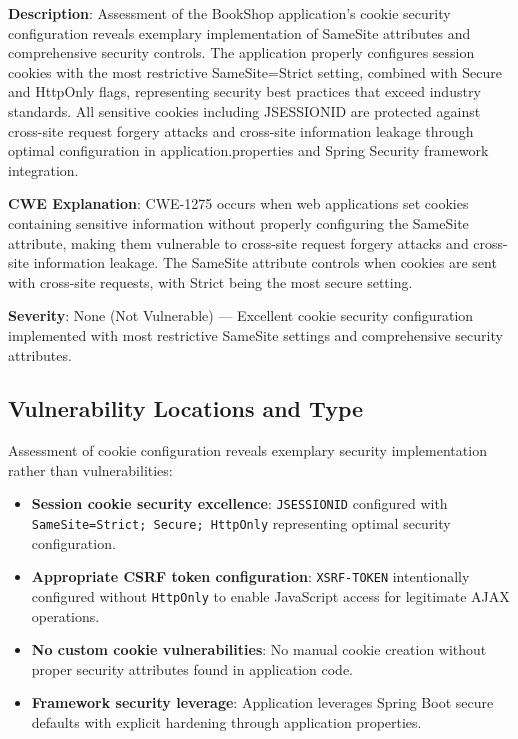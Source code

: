 \documentclass[]{UCD_CS_FYP_Report}
\begin{document}
	\textbf{Description}: Assessment of the BookShop application's cookie security configuration reveals exemplary implementation of SameSite attributes and comprehensive security controls. The application properly configures session cookies with the most restrictive SameSite=Strict setting, combined with Secure and HttpOnly flags, representing security best practices that exceed industry standards. All sensitive cookies including JSESSIONID are protected against cross-site request forgery attacks and cross-site information leakage through optimal configuration in application.properties and Spring Security framework integration.

	\textbf{CWE Explanation}: CWE-1275 occurs when web applications set cookies containing sensitive information without properly configuring the SameSite attribute, making them vulnerable to cross-site request forgery attacks and cross-site information leakage. The SameSite attribute controls when cookies are sent with cross-site requests, with Strict being the most secure setting.

	\textbf{Severity}: None (Not Vulnerable) — Excellent cookie security configuration implemented with most restrictive SameSite settings and comprehensive security attributes.

\subsection{Vulnerability Locations and Type}
Assessment of cookie configuration reveals exemplary security implementation rather than vulnerabilities:
\begin{itemize}
	\item \textbf{Session cookie security excellence}: \texttt{JSESSIONID} configured with \texttt{SameSite=Strict; Secure; HttpOnly} representing optimal security configuration.
	\item \textbf{Appropriate CSRF token configuration}: \texttt{XSRF-TOKEN} intentionally configured without \texttt{HttpOnly} to enable JavaScript access for legitimate AJAX operations.
	\item \textbf{No custom cookie vulnerabilities}: No manual cookie creation without proper security attributes found in application code.
	\item \textbf{Framework security leverage}: Application leverages Spring Boot secure defaults with explicit hardening through application properties.
\end{itemize}
\end{document}
